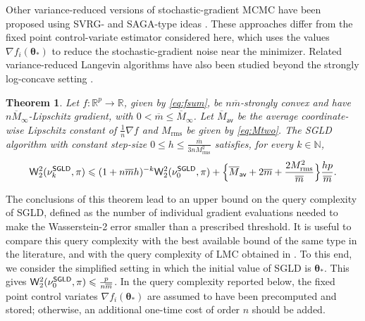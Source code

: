 \documentclass[aos,reqno]{imsart}
\newcommand\btheta{\boldsymbol\theta}
\def\wass{\mathsf{W}}
\def\Mtwo{M_{\mathrm{rms}}}
\def\mbar{\overline m}
\def\Mmaxbar{\overline M_{\infty}}
\def\Mavbar{\overline M_{\textsf{av}}}
\newtheorem{theorem}{Theorem}
\theoremstyle{definition}
\begin{document}
Other variance-reduced versions of stochastic-gradient
MCMC have been proposed using SVRG- and SAGA-type ideas
\citep{dubey2016,chatterji2018}. These
approaches differ from the fixed point control-variate
estimator considered here, which uses the values
$\nabla f_i(\btheta_*)$ to reduce the stochastic-gradient
noise near the minimizer. Related variance-reduced
Langevin algorithms have also been studied beyond the
strongly log-concave setting \citep{zou2019}.

\begin{theorem}\label{th:sgld}
    Let $f:\mathbb R^p\to\mathbb R$, given by 
    \eqref{eq:fsum}, be $n\mbar$-strongly convex and have 
    $n\Mmaxbar$-Lipschitz gradient, with $0<\mbar\leqslant 
    \Mmaxbar$. Let $\Mavbar$ be the average coordinate-wise 
    Lipschitz constant of $\tfrac1n\nabla f$ and $\Mtwo$ 
    be given by \eqref{eq:Mtwo}. The SGLD algorithm with 
    constant step-size
    $0\leqslant h \leqslant \frac{\mbar}{3n\Mtwo^2}$
    satisfies, for every $k\in\mathbb N$,
    \begin{align}
        \wass_2^2(\nu_k^{\sf SGLD},\pi)
        \leqslant
        (1+n\mbar h)^{-k}\wass_2^2(\nu_0^{\sf SGLD},\pi)
        + \Big\{\Mavbar+2\mbar+\frac{2\Mtwo^2}{\mbar}\Big\}
        \frac{hp}{\mbar}.
        \label{claim-sgld-3a}
    \end{align}
\end{theorem}

The conclusions of this theorem lead to an upper bound on
the query complexity of SGLD, defined as the number of
individual gradient evaluations needed to make the
Wasserstein-2 error smaller than a prescribed threshold.
It is useful to compare this query complexity with the best
available bound of the same type in the literature, and
with the query complexity of LMC obtained in .
To this end, we consider the simplified setting in which
the initial value of SGLD is $\btheta_*$. This gives
$\wass_2^2(\nu_0^{\sf SGLD},\pi) \leqslant \frac{p}{n\mbar}$. 
In the query complexity reported below, the fixed point
control variates $\nabla f_i(\btheta_*)$ are assumed to
have been precomputed and stored; otherwise, an additional
one-time cost of order $n$ should be added.
\end{document}
